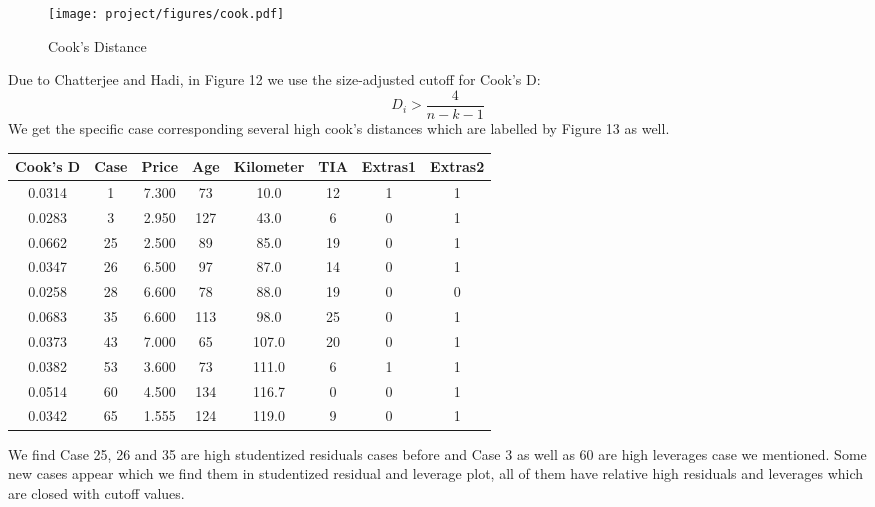 \documentclass[a4paper]{article}
\begin{document}
\begin{figure}[!htb]
    \centering
    \texttt{[image: project/figures/cook.pdf]}
    \caption{Cook's Distance}
    \label{fig:my_label}
\end{figure}

\noindent
Due to Chatterjee and Hadi, in Figure 12 we use the size-adjusted cutoff for Cook's D: \[D_i > \frac{4}{n-k-1}\] 
 We get the specific case corresponding several high cook's distances which are labelled by Figure 13 as well. 
\begin{table}[!htb]
\centering
\begin{tabular}{cccccccc}
\toprule
Cook's D & Case & Price & Age & Kilometer & TIA & Extras1 & Extras2 \\
\midrule
0.0314   & 1    & 7.300 & 73  & 10.0      & 12  & 1       & 1       \\
0.0283   & 3    & 2.950 & 127 & 43.0      & 6   & 0       & 1       \\
0.0662   & 25   & 2.500 & 89  & 85.0      & 19  & 0       & 1       \\
0.0347   & 26   & 6.500 & 97  & 87.0      & 14  & 0       & 1       \\
0.0258   & 28   & 6.600 & 78  & 88.0      & 19  & 0       & 0       \\
0.0683   & 35   & 6.600 & 113 & 98.0      & 25  & 0       & 1       \\
0.0373   & 43   & 7.000 & 65  & 107.0     & 20  & 0       & 1       \\
0.0382   & 53   & 3.600 & 73  & 111.0     & 6   & 1       & 1       \\
0.0514   & 60   & 4.500 & 134 & 116.7     & 0   & 0       & 1       \\
0.0342   & 65   & 1.555 & 124 & 119.0     & 9   & 0       & 1       \\
\bottomrule
\end{tabular}
\end{table}
We find Case 25, 26 and 35 are high studentized residuals cases before and Case 3 as well as 60 are high leverages case we mentioned. Some new cases appear which we find them in studentized residual and leverage plot, all of them have relative high residuals and leverages which are closed with cutoff values.
\end{document}
